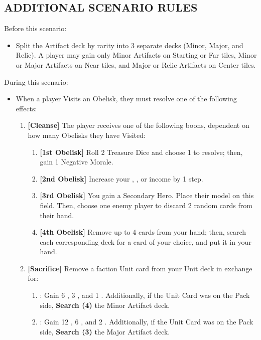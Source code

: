 \begin{multicols*}{2}
\subsection*{\MakeUppercase{Additional Scenario Rules}}
Before this scenario:
\begin{itemize}
    \item Split the Artifact deck by rarity into 3 separate decks (Minor, Major, and Relic). A player may gain only Minor Artifacts on Starting or Far tiles, Minor or Major Artifacts on Near tiles, and Major or Relic Artifacts on Center tiles.
\end{itemize}
During this scenario:
\begin{itemize}
    \item When a player Visits an Obelisk, they must resolve one of the following effects:
    \begin{enumerate}
        \item \textbf{[Cleanse]} The player receives one of the following boons, dependent on how many Obelisks they have Visited:
        \begin{enumerate}
            \item \textbf{[1st Obelisk]} Roll 2 Treasure Dice and choose 1 to resolve; then, gain 1 Negative Morale.
            \item \textbf{[2nd Obelisk]} Increase your , , or  income by 1 step.
            \item \textbf{[3rd Obelisk]} You gain a Secondary Hero. Place their model on this field. Then, choose one enemy player to discard 2 random cards from their hand.
            \item \textbf{[4th Obelisk]} Remove up to 4 cards from your hand; then, search each corresponding deck for a card of your choice, and put it in your hand.
        \end{enumerate}
        \item \textbf{[Sacrifice]} Remove a faction Unit card from your Unit deck in exchange for:
        \begin{enumerate}
            \item {}: Gain 6 , 3 , and 1 . Additionally, if the Unit Card was on the Pack side, \textbf{Search (4)} the Minor Artifact deck.
            \item {}: Gain 12 , 6 , and 2 . Additionally, if the Unit Card was on the Pack side, \textbf{Search (3)} the Major Artifact deck.

\end{enumerate}
\end{enumerate}
\end{itemize}
\end{multicols*}
